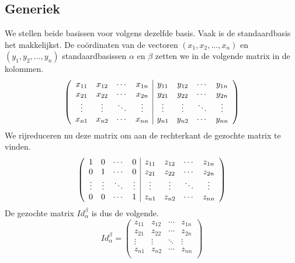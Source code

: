 \documentclass[lineaire_algebra_oplossingen.tex]{subfiles}
\begin{document}
\subsection*{Generiek}
We stellen beide basissen voor volgens dezelfde basis. Vaak is de standaardbasis het makkelijkst. %
De co\"ordinaten van de vectoren $(x_1,x_2,...,x_n)$ en $(y_1,y_2,...,y_n)$ standaardbasissen $\alpha$ en $\beta$ zetten we in de volgende matrix in de kolommen.
\[
\left(
\begin{array}{c c c c | c c c c}
x_{11} & x_{12} & \cdots & x_{1n} & y_{11} & y_{12} & \cdots & y_{1n}\\
x_{21} & x_{22} & \cdots & x_{2n} & y_{21} & y_{22} & \cdots & y_{2n}\\
\vdots & \vdots & \ddots & \vdots & \vdots & \vdots & \ddots & \vdots\\
x_{n1} & x_{n2} & \cdots & x_{nn} & y_{n1} & y_{n2} & \cdots & y_{nn}\\
\end{array}
\right)
\]
We rijreduceren nu deze matrix om aan de rechterkant de gezochte matrix te vinden.
\[
\left(
\begin{array}{c c c c | c c c c}
1 & 0 & \cdots & 0 & z_{11} & z_{12} & \cdots & z_{1n}\\
0 & 1 & \cdots & 0 & z_{21} & z_{22} & \cdots & z_{2n}\\
\vdots & \vdots & \ddots & \vdots & \vdots & \vdots & \ddots & \vdots\\
0 & 0 & \cdots & 1 & z_{n1} & z_{n2} & \cdots & z_{nn}\\
\end{array}
\right)
\]
De gezochte matrix $Id_\alpha^\beta$ is dus de volgende.
\[
Id_\alpha^\beta
=
\begin{pmatrix}
z_{11} & z_{12} & \cdots & z_{1n}\\
z_{21} & z_{22} & \cdots & z_{2n}\\
\vdots & \vdots & \ddots & \vdots\\
z_{n1} & z_{n2} & \cdots & z_{nn}\\
\end{pmatrix}
\]
\end{document}
